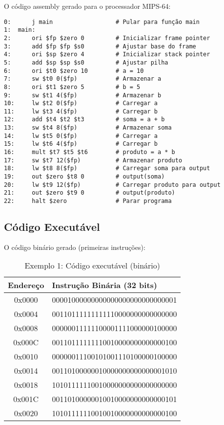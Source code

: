 \documentclass[
	12pt,				%
	oneside,
	a4paper,			%
	english,			%
	french,				%
	spanish,			%
	brazil,				%
	]{abntex2}
\begin{document}
O código assembly gerado para o processador MIPS-64:

\begin{lstlisting}[style=assemblystyle, caption=Exemplo 1: Código assembly MIPS]
0:      j main                  # Pular para função main
1:  main:
2:      ori $fp $zero 0         # Inicializar frame pointer
3:      add $fp $fp $s0         # Ajustar base do frame
4:      ori $sp $zero 4         # Inicializar stack pointer
5:      add $sp $sp $s0         # Ajustar pilha
6:      ori $t0 $zero 10        # a = 10
7:      sw $t0 0($fp)           # Armazenar a
8:      ori $t1 $zero 5         # b = 5
9:      sw $t1 4($fp)           # Armazenar b
10:     lw $t2 0($fp)           # Carregar a
11:     lw $t3 4($fp)           # Carregar b
12:     add $t4 $t2 $t3         # soma = a + b
13:     sw $t4 8($fp)           # Armazenar soma
14:     lw $t5 0($fp)           # Carregar a
15:     lw $t6 4($fp)           # Carregar b
16:     mult $t7 $t5 $t6        # produto = a * b
17:     sw $t7 12($fp)          # Armazenar produto
18:     lw $t8 8($fp)           # Carregar soma para output
19:     out $zero $t8 0         # output(soma)
20:     lw $t9 12($fp)          # Carregar produto para output
21:     out $zero $t9 0         # output(produto)
22:     halt $zero              # Parar programa
\end{lstlisting}

\subsection{Código Executável}

O código binário gerado (primeiras instruções):

\begin{table}[H]
\centering
\caption{Exemplo 1: Código executável (binário)}
\begin{tabular}{|c|l|}
\hline
\textbf{Endereço} & \textbf{Instrução Binária (32 bits)} \\
\hline
0x0000 & 00001000000000000000000000000001 \\
\hline
0x0004 & 00110111111111110000000000000000 \\
\hline
0x0008 & 00000011111100001111000000100000 \\
\hline
0x000C & 00110111111110010000000000000100 \\
\hline
0x0010 & 00000011100101001110100000100000 \\
\hline
0x0014 & 00110100000010000000000000001010 \\
\hline
0x0018 & 10101111110010000000000000000000 \\
\hline
0x001C & 00110100000010010000000000000101 \\
\hline
0x0020 & 10101111110010010000000000000100 \\
\hline
\end{tabular}
\end{table}
\end{document}
